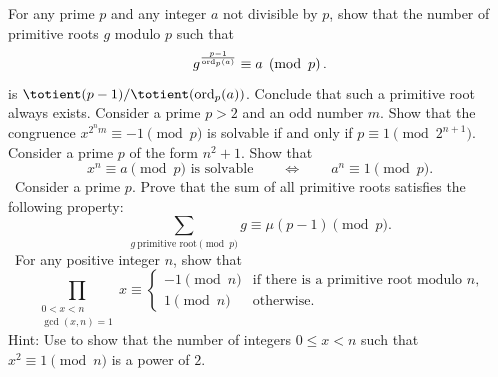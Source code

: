 \begin{challenge}
  \exercise \label{exercise:primitive-root-with-universal-exponent}For any prime $p$ and any integer $a$ not divisible by $p$, show that the number of primitive roots $g$ modulo $p$ such that
  \begin{equation*}
    g^{\frac{p-1}{\operatorname{ord}_p(a)}}\equiv a\mkern5mu\left(\operatorname{mod} \mkern 6mu p\right).
  \end{equation*}
  is $\totient(p-1)/\totient(\ord_p(a))$. Conclude that such a primitive root always exists.
  \exercise Consider a prime $p>2$ and an odd number $m$. Show that the congruence $x^{2^nm}\equiv -1\pmod{p}$ is solvable if and only if $p\equiv 1\pmod{2^{n+1}}$.
  \exercise Consider a prime $p$ of the form $n^2+1$. Show that
  \begin{equation*}
    x^n\equiv a\pmod{p}\text{ is solvable}\qquad\Leftrightarrow\qquad a^n\equiv 1\pmod{p}.
  \end{equation*}
  \exercise \cite[art. 81]{gauss1986}~Consider a prime $p$. Prove that the sum of all primitive roots satisfies the following property:
  \begin{equation*}
    \sum_{g~\text{primitive root}\pmod{p}}g \equiv \mu(p-1)\pmod{p}.
  \end{equation*}
  \exercise \cite[art.~78]{gauss1986}~For any positive integer $n$, show that
  \begin{equation*}
    \prod_{\substack{0<x<n\\ \gcd(x,n)=1}} x \equiv
    \begin{cases}
      -1\pmod{n} & \text{if there is a primitive root modulo $n$,}\\
      1\pmod{n} & \text{otherwise.}
    \end{cases}
  \end{equation*}
  Hint: Use  to show that the number of integers $0\leq x<n$ such that $x^2\equiv 1\pmod{n}$ is a power of $2$.
\end{challenge}

